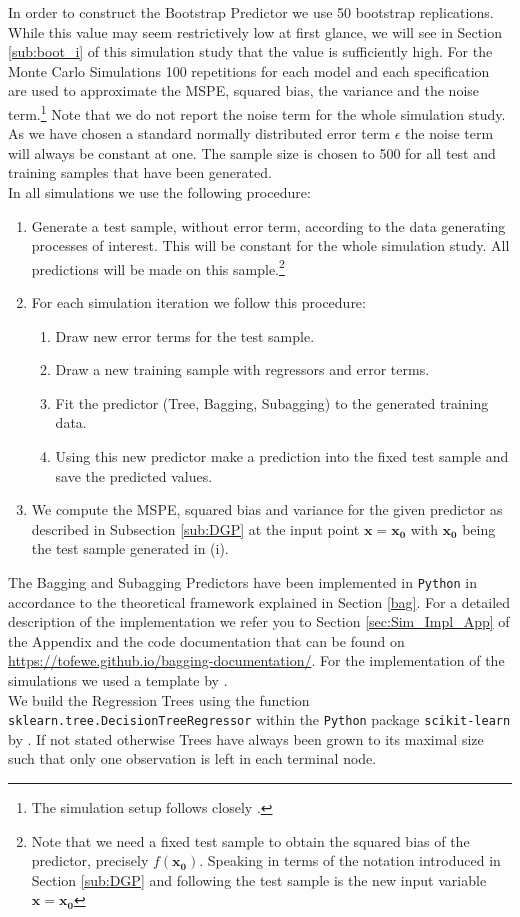 In order to construct the Bootstrap Predictor we use 50 bootstrap replications. While this value may seem restrictively low at first glance, we will see in Section \ref{sub:boot_i} of this simulation study that the value is sufficiently high.
For the Monte Carlo Simulations 100 repetitions for each model and each specification are used to approximate the MSPE, squared bias, the variance and the noise term.\footnote{The simulation setup follows closely \cite{Buhlmann2002}.} Note that we do not report the noise term for the whole simulation study. As we have chosen a standard normally distributed error term $\epsilon$ the noise term will always be constant at one. The sample size is chosen to 500 for all test and training samples that have been generated.\\
In all simulations we use the following procedure:
\begin{enumerate}
  \item Generate a test sample, without error term, according to the data generating processes of interest. This will be constant for the whole simulation study. All predictions will be made on this sample.\footnote{Note that we need a fixed test sample to obtain the squared bias of the predictor, precisely $f(\mathbf{x_0})$. Speaking in terms of the notation introduced in Section \ref{sub:DGP} and following \cite{EoSL} the test sample is the new input variable $\mathbf{x}=\mathbf{x_0}$}
  \item For each simulation iteration we follow this procedure:
  \begin{enumerate}
    \item Draw new error terms for the test sample.
    \item Draw a new training sample with regressors and error terms.
    \item Fit the predictor (Tree, Bagging, Subagging) to the generated training data.
    \item Using this new predictor make a prediction into the fixed test sample and save the predicted values.
  \end{enumerate}

  \item We compute the MSPE, squared bias and variance for the given predictor as described in Subsection \ref{sub:DGP} at the input point $\mathbf{x}=\mathbf{x_{0}}$ with $\mathbf{x_{0}}$ being the test sample generated in (i).
\end{enumerate}
The Bagging and Subagging Predictors have been implemented in \texttt{Python} in accordance to the theoretical framework explained in Section \ref{bag}. For a detailed description of the implementation we refer you to Section \ref{sec:Sim_Impl_App} of the Appendix and the code documentation that can be found on \url{https://tofewe.github.io/bagging-documentation/}. For the implementation of the simulations we used a template by \cite{Gaudecker2014}.\\ We build the Regression Trees using the function \texttt{sklearn.tree.DecisionTreeRegressor} within the \texttt{Python} package \texttt{scikit-learn} by \cite{scikit-learn2011}. If not stated otherwise Trees have always been grown to its maximal size such that only one observation is left in each terminal node.


